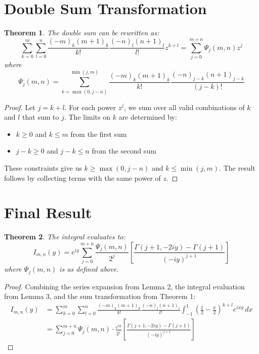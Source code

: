 \documentclass[12pt]{article}
\newtheorem{theorem}{Theorem}
\begin{document}
\section*{Double Sum Transformation}

\begin{theorem}
The double sum can be rewritten as:
\[
\sum_{k=0}^m \sum_{l=0}^n \frac{(-m)_k (m+1)_k}{k!} \frac{(-n)_l (n+1)_l}{l!} z^{k+l}
= \sum_{j=0}^{m+n} \Psi_j(m,n) z^j
\]
where
\[
\Psi_j(m,n) = \sum_{k=\max(0,j-n)}^{\min(j,m)} 
\frac{(-m)_k (m+1)_k}{k!} 
\frac{(-n)_{j-k} (n+1)_{j-k}}{(j-k)!}
\]
\end{theorem}

\begin{proof}
Let $j = k + l$. For each power $z^j$, we sum over all valid combinations of $k$ and $l$ that sum to $j$. The limits on $k$ are determined by:
\begin{itemize}
\item $k \geq 0$ and $k \leq m$ from the first sum
\item $j-k \geq 0$ and $j-k \leq n$ from the second sum
\end{itemize}
These constraints give us $k \geq \max(0,j-n)$ and $k \leq \min(j,m)$. The result follows by collecting terms with the same power of $z$.
\end{proof}

\section*{Final Result}

\begin{theorem}
The integral evaluates to:
\[
I_{m,n}(y) = e^{iy} \sum_{j=0}^{m+n} \frac{\Psi_j(m,n)}{2^j} 
\left[\frac{\Gamma(j+1,-2iy)-\Gamma(j+1)}{(-iy)^{j+1}}\right]
\]
where $\Psi_j(m,n)$ is as defined above.
\end{theorem}

\begin{proof}
Combining the series expansion from Lemma 2, the integral evaluation from Lemma 3, and the sum transformation from Theorem 1:
\begin{align*}
I_{m,n}(y) &= \sum_{k=0}^m \sum_{l=0}^n \frac{(-m)_k (m+1)_k}{k!} \frac{(-n)_l (n+1)_l}{l!} 
\int_{-1}^1 \left(\frac{1}{2} - \frac{x}{2}\right)^{k+l} e^{i x y} \, dx \\
&= \sum_{j=0}^{m+n} \Psi_j(m,n) \cdot \frac{e^{iy}}{2^j} 
\left[\frac{\Gamma(j+1,-2iy)-\Gamma(j+1)}{(-iy)^{j+1}}\right]
\end{align*}
\end{proof}
\end{document}
